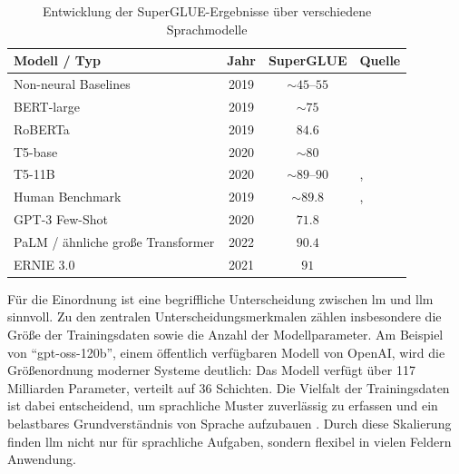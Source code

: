 \begin{table}[ht]
    \centering
    \caption[SuperGLUE-Ergebnisse verschiedener Sprachmodelle]{Entwicklung der SuperGLUE-Ergebnisse über verschiedene Sprachmodelle}
    \label{tab:102_superglue-entwicklung}
    \begin{tabular}{l c c l}
        \hline
        \textbf{Modell / Typ} & \textbf{Jahr} & \textbf{SuperGLUE} & \textbf{Quelle} \\
        \hline

        Non-neural Baselines
            & 2019 & $\sim 45$--$55$
            & \cite{wang2020supergluestickierbenchmarkgeneralpurpose} \\

        BERT-large
            & 2019 & $\sim 75$
            & \cite{wang2020supergluestickierbenchmarkgeneralpurpose} \\

        RoBERTa
            & 2019 & $84.6$
            & \cite{supergluebenchmark} \\

        T5-base
            & 2020 & $\sim 80$
            & \cite[Tabelle 14]{raffel2023exploringlimitstransferlearning} \\

        T5-11B
            & 2020 & $\sim 89$--$90$
            & \cite[Tabelle 14]{raffel2023exploringlimitstransferlearning}, \cite{supergluebenchmark} \\

        Human Benchmark
            & 2019 & $\sim 89.8$
            & \cite{wang2020supergluestickierbenchmarkgeneralpurpose}, \cite{supergluebenchmark} \\

        GPT-3 Few-Shot
            & 2020 & $71.8$
            & \cite[Tabelle 3.8]{brown2020languagemodelsfewshotlearners} \\

        PaLM / ähnliche große Transformer
            & 2022 & $90.4$
            & \cite[Tabelle 9]{chowdhery2022palmscalinglanguagemodeling} \\

		ERNIE 3.0
			& 2021 & $91$
			& \cite[Tabelle 9]{sun2021ernie30largescaleknowledge}\\
        \hline
    \end{tabular}
\end{table}

Für die Einordnung ist eine begriffliche Unterscheidung zwischen \gls{lm} und \gls{llm} sinnvoll.
Zu den zentralen Unterscheidungsmerkmalen zählen insbesondere die Größe der Trainingsdaten sowie die Anzahl der Modellparameter.
Am Beispiel von \enquote{gpt-oss-120b}, einem öffentlich verfügbaren Modell von OpenAI, wird die Größenordnung moderner Systeme deutlich: Das Modell verfügt über 117 Milliarden Parameter, verteilt auf 36 Schichten.
Die Vielfalt der Trainingsdaten ist dabei entscheidend, um sprachliche Muster zuverlässig zu erfassen und ein belastbares Grundverständnis von Sprache aufzubauen \cite[S. 10]{yenduri2023generativepretrainedtransformercomprehensive}.
Durch diese Skalierung finden \gls{llm} nicht nur für sprachliche Aufgaben, sondern flexibel in vielen Feldern Anwendung. \\

